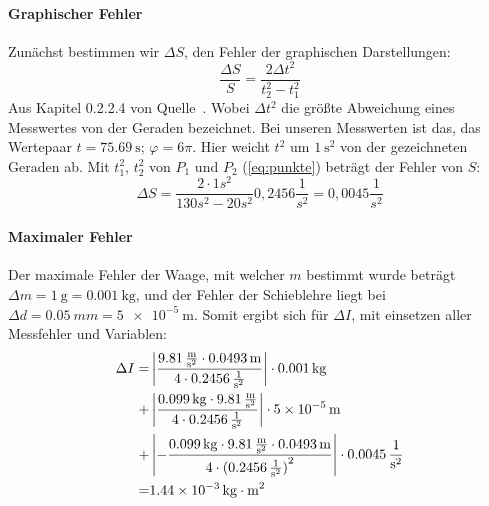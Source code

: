 \documentclass{article}
\begin{document}
	\paragraph{Graphischer Fehler} 
	Zunächst bestimmen wir \( \Delta S \), den Fehler der graphischen Darstellungen:
	\begin{equation}
		\frac{\Delta S}{S} = \frac{ 2 \Delta t^2 }{t^2_2 - t^2_1}
	\end{equation}
	Aus Kapitel 0.2.2.4 von Quelle~\cite{AnleitungPraktikum}.
	Wobei \( \Delta t^2 \) die größte Abweichung eines Messwertes von der Geraden bezeichnet.
	Bei unseren Messwerten ist das, das Wertepaar \( t = \SI{75,69}{\second} \); \( \varphi = 6\pi \).
	Hier weicht \( t^2 \) um \( \SI{1}{\second^2} \) von der gezeichneten Geraden ab.
	Mit \( t^2_1 \), \( t^2_2 \) von \( P_1 \) und \( P_2 \) (\ref{eq:punkte}) beträgt der Fehler von \( S \):
	\begin{equation}
		\Delta S = \frac{2\cdot 1s^2}{130s^2 - 20s^2}0,2456\frac{1}{s^2} = 0,0045\frac{1}{s^2}
	\end{equation}

	\paragraph{Maximaler Fehler}
	Der maximale Fehler der Waage, mit welcher \(m\) bestimmt wurde beträgt \(\Delta m = \SI{1}{\gram} = \SI{0.001}{\kilogram}\),
	und der Fehler der Schieblehre liegt bei \( \Delta d = \SI{0,05}{mm} = \SI{5e-5}{\metre} \).
	Somit ergibt sich für \( \Delta I \), mit einsetzen aller Messfehler und Variablen:
	\begin{equation}
		\begin{aligned}
			\Delta I = & \left| \frac{ \SI{9,81}{\frac{\metre}{\second^2}} \cdot \SI{0,0493}{\metre} }{ 4 \cdot \SI{0,2456}{\frac{1}{\second^2}} } \right| \cdot \SI{0,001}{\kilogram}                                           \\
			+          & \left| \frac{ \SI{0,099}{\kilogram} \cdot \SI{9,81}{\frac{\metre}{\second^2}} }{ 4 \cdot \SI{0,2456}{\frac{1}{\second^2}} } \right| \cdot \SI{5e-5}{\metre}                                             \\
			+          & \left| - \frac{ \SI{0,099}{\kilogram} \cdot  \SI{9,81}{\frac{\metre}{\second^2}} \cdot \SI{0,0493}{\metre} }{ 4 \cdot {(\SI{0,2456}{\frac{1}{\second^2}})}^2 } \right| \cdot \SI{0,0045}{\frac{1}{s^2}} \\
			=          & \SI{1,44e-3}{ \kilogram \cdot \metre^2 }
		\end{aligned}
	\end{equation}
\end{document}
